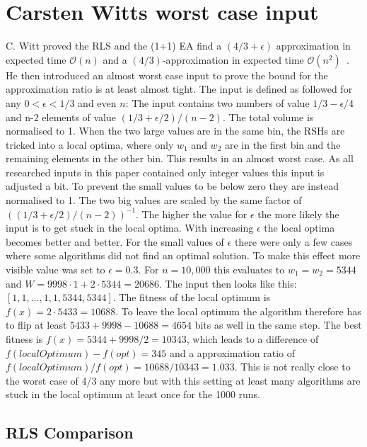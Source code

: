 \section{Carsten Witts worst case input}
C. Witt proved the RLS and the (1+1) EA find a $(4/3+\epsilon)$ approximation in expected time $\mathcal{O}(n)$ and a $(4/3)$-approximation in expected time $\mathcal{O}(n^2)$~\cite{diekert2005stacs}.
He then introduced an almost worst case input to prove the bound for the approximation ratio is at least almost tight.
The input is defined as followed for any $0<\epsilon<1/3$ and even $n$:\newline
The input contains two numbers of value $1/3 - \epsilon/4$ and n-2 elements of value $(1/3+\epsilon/2)/(n-2)$. 
The total volume is normalised to 1.
When the two large values are in the same bin, the RSHs are tricked into a local optima, where only $w_1$ and $w_2$ are in the first bin and the remaining elements in the other bin.
This results in an almost worst case.
As all researched inputs in this paper contained only integer values this input is adjusted a bit.
To prevent the small values to be below zero they are instead normalised to 1.
The two big values are scaled by the same factor of $((1/3+\epsilon/2)/(n-2))^{-1}$.
The higher the value for $\epsilon$ the more likely the input is to get stuck in the local optima.
With increasing $\epsilon$ the local optima becomes better and better.
For the small values of $\epsilon$ there were only a few cases where some algorithms did not find an optimal solution.
To make this effect more visible value was set to $\epsilon=0.3$.\newline
For $n=10,000$ this evaluates to $w_1=w_2=5344$ and $W=9998 \cdot 1 + 2 \cdot 5344 = 20686$.
The input then looks like this: $[1, 1, \dots, 1, 1, 5344, 5344]$.
The fitness of the local optimum is $f(x) = 2 \cdot 5433 = 10688$.
To leave the local optimum the algorithm therefore has to flip at least  $5433+9998-10688 = 4654$ bits as well in the same step.
The best fitness is $f(x) = 5344 + 9998/2 = 10343$, which leads to a difference of $f(localOptimum)-f(opt) = 345$ and a approximation ratio of $f(localOptimum)/f(opt)=10688/10343=1.033$.
This is not really close to the worst case of 4/3 any more but with this setting at least many algorithms are stuck in the local optimum at least once for the 1000 runs.
\subsection{RLS Comparison}


